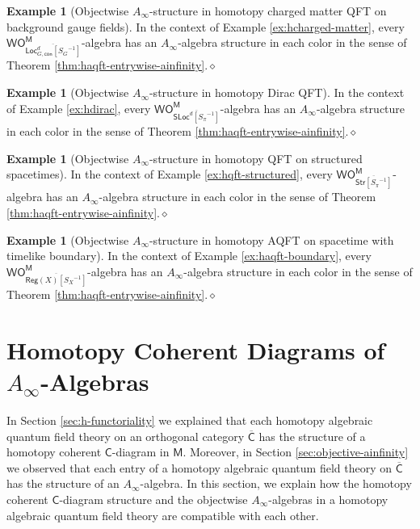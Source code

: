 \documentclass[11pt]{amsbook}
\numberwithin{section}{chapter}
\numberwithin{subsection}{section}
\numberwithin{equation}{section}
\theoremstyle{plain}
\theoremstyle{definition}
\newtheorem{example}[equation]{Example}
\newcommand{\C}{\mathsf{C}}
\newcommand{\M}{\mathsf{M}}
\renewcommand{\O}{\mathsf{O}}
\newcommand{\Otom}{\O^{\M}}
\newcommand{\W}{\mathsf{W}}
\newcommand{\dqed}{\hfill$\diamond$}
\newcommand{\inv}[1]{{#1}^{-1}}
\newcommand{\Cbar}{\overline{\C}}
\newcommand{\Bgconloc}{\Locd_{G,\mathsf{con}}}
\newcommand{\Bgconlocsginv}{\Bgconloc[\inv{S_G}]}
\newcommand{\Bgconlocsginvbar}{\overline{\Bgconlocsginv}}
\newcommand{\Loc}{\mathsf{Loc}}
\newcommand{\Locd}{\Loc^d}
\newcommand{\Reg}{\mathsf{Reg}}
\newcommand{\Regx}{\Reg(X)}
\newcommand{\Regxsinv}{\Regx[\inv{S_X}]}
\newcommand{\Regxsinvbar}{\overline{\Regxsinv}}
\newcommand{\Sloc}{\mathsf{SLoc}}
\newcommand{\Slocd}{\Sloc^d}
\newcommand{\Slocdsinv}{\Slocd[\inv{S_{\pi}}]}
\newcommand{\Slocdsinvbar}{\overline{\Slocdsinv}}
\newcommand{\Str}{\mathsf{Str}}
\newcommand{\Strsinv}{\Str[\inv{S_{\pi}}]}
\newcommand{\Strsinvbar}{\overline{\Strsinv}}
\newcommand{\wom}{\W\Otom}
\begin{document}
\begin{example}[Objectwise $A_\infty$-structure in homotopy charged matter QFT on background gauge fields]\label{ex:ainfinity-charged}
In the context of Example \ref{ex:hcharged-matter}, every  $\wom_{\Bgconlocsginvbar}$-algebra has an $A_\infty$-algebra structure in each color in the sense of Theorem \ref{thm:haqft-entrywise-ainfinity}.\dqed
\end{example}

\begin{example}[Objectwise $A_\infty$-structure in homotopy Dirac QFT]\label{ex:ainfinity-dirac}
In the context of Example \ref{ex:hdirac}, every  $\wom_{\Slocdsinvbar}$-algebra has an $A_\infty$-algebra structure in each color in the sense of Theorem \ref{thm:haqft-entrywise-ainfinity}.\dqed
\end{example}

\begin{example}[Objectwise $A_\infty$-structure in homotopy QFT on structured spacetimes]\label{ex:ainfinity-structured}
In the context of Example \ref{ex:hqft-structured}, every $\wom_{\Strsinvbar}$-algebra has an $A_\infty$-algebra structure in each color in the sense of Theorem \ref{thm:haqft-entrywise-ainfinity}.\dqed
\end{example}

\begin{example}[Objectwise $A_\infty$-structure in homotopy AQFT on spacetime with timelike boundary]\label{ex:ainfinity-boundary}
In the context of Example \ref{ex:haqft-boundary}, every $\wom_{\Regxsinvbar}$-algebra has an $A_\infty$-algebra structure in each color in the sense of Theorem \ref{thm:haqft-entrywise-ainfinity}.\dqed
\end{example}


\section{Homotopy Coherent Diagrams of $A_\infty$-Algebras}\label{sec:hcdiag-ainfinity}

In Section \ref{sec:h-functoriality} we explained that each homotopy algebraic quantum field theory on an orthogonal category $\Cbar$ has the structure of a homotopy coherent $\C$-diagram in $\M$.  Moreover, in Section \ref{sec:objective-ainfinity} we observed that each entry of a homotopy algebraic quantum field theory on $\Cbar$ has the structure of an $A_\infty$-algebra.  In this section, we explain how the homotopy coherent $\C$-diagram structure and the objectwise $A_\infty$-algebras in a homotopy algebraic quantum field theory are compatible with each other.
\end{document}
